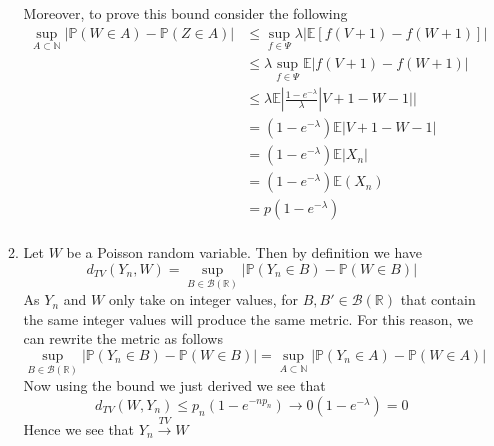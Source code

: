 \documentclass[12pt]{article}  %
\newcommand{\N}{{\mathbb{N}}}
\newcommand{\R}{{\mathbb{R}}}
\newcommand{\E}{{\mathbb{E}}}
\newcommand{\prob}{{\mathbb{P}}}
\begin{document}
\begin{enumerate}
\begin{enumerate}
Moreover, to prove this bound consider the following 
\begin{align*}
\sup_{A\subset\N}|\prob(W\in A)-\prob(Z\in A)|&\leq \sup_{f\in\Psi}\lambda|\E[f(V+1)-f(W+1)]|\\
&\leq\lambda \sup_{f\in\Psi}\E|f(V+1)-f(W+1)|\\
&\leq\lambda \E|\frac{1-e^{-\lambda}}{\lambda}|V+1 - W - 1||\\
&=(1-e^{-\lambda})\E|V+1 - W - 1|\\
&=(1-e^{-\lambda})\E|X_n|\\
&=(1-e^{-\lambda})\E(X_n)\\
&=p(1-e^{-\lambda})\\
\end{align*}
\item Let $W$ be a Poisson random variable. Then by definition we have $$d_{TV}(Y_n, W) = \sup_{B\in\mathcal{B}(\R)}|\prob(Y_n \in B)-\prob(W\in B)|$$ As $Y_n$ and $W$ only take on integer values, for $B,B'\in\mathcal{B}(\R)$ that contain the same integer values will produce the same metric. For this reason, we can rewrite the metric as follows 
$$\sup_{B\in\mathcal{B}(\R)}|\prob(Y_n \in B)-\prob(W\in B)| = \sup_{A\subset\N}|\prob(Y_n \in A)-\prob(W\in A)|$$ Now using the bound we just derived we see that $$d_{TV}(W, Y_n)\leq p_n(1-e^{-np_n})\to0(1-e^{-\lambda}) = 0$$ Hence we see that $Y_n\overset{TV}{\longrightarrow}W$
\end{enumerate}	

\end{enumerate}	
\end{document}
